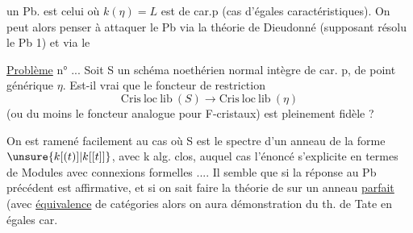un Pb. est celui où $k(\eta)=L$ est de car.p (cas d'égales caractéristiques). On peut alors penser à attaquer le Pb via la théorie de Dieudonné (supposant résolu le Pb 1) et via le

\uline{Problème} n° ... Soit S un schéma noethérien normal  intègre de car. p, de point générique $\eta$. Est-il vrai que le foncteur de restriction
\[
\mathrm{Cris\ loc\ lib}\ (S)\longrightarrow\mathrm{Cris\ loc\ lib}\ (\eta)
\]
(ou du moins le foncteur analogue pour F-cristaux) est pleinement fidèle ?

On est ramené facilement au cas où S est le spectre d'un anneau de la forme $\unsure{k[(t)]|k[[t]]}$, avec k alg. clos, auquel cas l'énoncé s'explicite en termes de Modules avec connexions formelles .... Il semble que si la réponse au Pb précédent est affirmative,  et si on sait faire la théorie de  sur un anneau \uline{parfait} (avec \uline{équivalence} de catégories alors on aura démonstration du th. de Tate en égales car.


